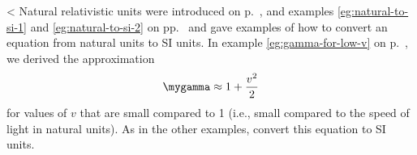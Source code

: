 <%
Natural relativistic units were introduced on p.~\pageref{natural-units},
and examples \ref{eg:natural-to-si-1} and \ref{eg:natural-to-si-2}
on pp.~\pageref{eg:natural-to-si-1} and \pageref{eg:natural-to-si-2} gave
examples of how to convert an equation from natural units to SI units.
In example \ref{eg:gamma-for-low-v} on p.~\pageref{eg:gamma-for-low-v},
we derived the approximation
\begin{equation*}
  \mygamma\approx1+\frac{v^2}{2}
\end{equation*}
for values of $v$ that are small compared to 1 (i.e., small compared to the speed of light
in natural units). As in the other examples, convert this equation to
SI units.
